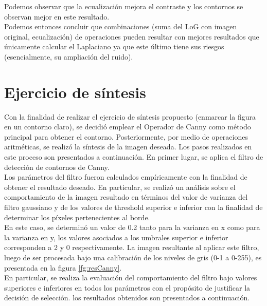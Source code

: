 \documentclass{article}
\begin{document}
Podemos observar que la ecualización mejora el contraste y los contornos se observan mejor en este resultado. \\
Podemos entonces concluir que combinaciones (suma del LoG con imagen original, ecualización) de operaciones pueden resultar con mejores resultados que únicamente calcular el Laplaciano ya que este último tiene sus riesgos (esencialmente, su ampliación del ruido).



\FloatBarrier
\section{Ejercicio de síntesis}

Con la finalidad de realizar el ejercicio de síntesis propuesto (enmarcar la figura en un contorno claro), se decidió emplear el Operador de Canny como método principal para obtener el contorno. Posteriormente, por medio de operaciones aritméticas, se realizó la síntesis de la imagen deseada. Los pasos realizados en este proceso son presentados a continuación. En primer lugar, se aplica el filtro de detección de contornos de Canny.\\ 
Los parámetros del filtro fueron calculados empíricamente con la finalidad de obtener el resultado deseado. En particular, se realizó un análisis sobre el comportamiento de la imagen resultado en términos del valor de varianza del filtro gaussiano y de los valores de threshold superior e inferior con la finalidad de determinar los píxeles pertenecientes al borde. \\
En este caso, se determinó un valor de 0.2 tanto para la varianza en x como para la varianza en y, los valores asociados a los umbrales superior e inferior corresponden a 2 y 0 respectivamente. La imagen resultante al aplicar este filtro, luego de ser procesada bajo una calibración de los niveles de gris (0-1 a 0-255), es presentada en la figura \ref{fg:resCanny}. \\
En particular, se realiza la evaluación del comportamiento del filtro bajo valores superiores e inferiores en todos los parámetros con el propósito de justificar la decisión de selección. los resultados obtenidos son presentados a continuación.
\end{document}
